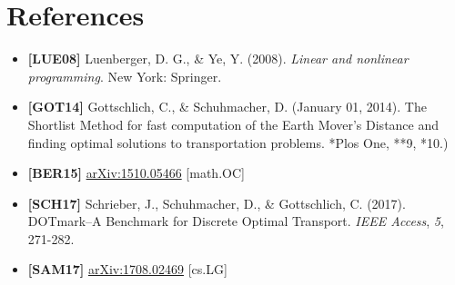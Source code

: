 \documentclass[]{article}
\begin{document}
\part*{References}

\begin{itemize}
\item
  \textbf{{[}LUE08{]}} Luenberger, D. G., \& Ye, Y. (2008). \emph{Linear
  and nonlinear programming}. New York: Springer.
\item
  \textbf{{[}GOT14{]}} Gottschlich, C., \& Schuhmacher, D. (January 01,
  2014). The Shortlist Method for fast computation of the Earth Mover's
  Distance and finding optimal solutions to transportation problems.
  *Plos One, **9, *10.)
\item
  \textbf{{[}BER15{]}}
  \href{https://arxiv.org/abs/1510.05466}{arXiv:1510.05466}
  {[}math.OC{]}
\item
  \textbf{{[}SCH17{]}} Schrieber, J., Schuhmacher, D., \& Gottschlich,
  C. (2017). DOTmark--A Benchmark for Discrete Optimal Transport.
  \emph{IEEE Access}, \emph{5}, 271-282.
\item
  \textbf{{[}SAM17{]}}
  \href{https://arxiv.org/abs/1708.02469}{arXiv:1708.02469} {[}cs.LG{]}
\end{itemize}
\end{document}
